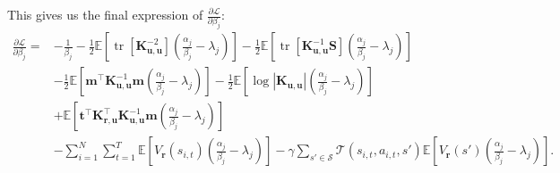 \documentclass{article}
\theoremstyle{definition}
\theoremstyle{remark}
\DeclareMathOperator{\tr}{tr}
\newcommand{\Kuu}{\mathbf{K}_{\mathbf{u},\mathbf{u}}}
\newcommand{\Kru}{\mathbf{K}_{\mathbf{r},\mathbf{u}}}
\begin{document}
This gives us the final expression of $\frac{\partial\mathcal{L}}{\partial\beta_j}$:
\[
  \begin{split}
    \frac{\partial\mathcal{L}}{\partial\beta_j} = &- \frac{1}{\beta_j} -
    \frac{1}{2}\mathbb{E} \left[ \tr[\Kuu^{-2}] \left( \frac{\alpha_j}{\beta_j}
        - \lambda_j \right) \right] - \frac{1}{2}\mathbb{E} \left[
      \tr[\Kuu^{-1}\mathbf{S}] \left(\frac{\alpha_j}{\beta_j} - \lambda_j
      \right) \right] \\
    &- \frac{1}{2}\mathbb{E} \left[ \mathbf{m}^\intercal\Kuu^{-1}\mathbf{m}
      \left(\frac{\alpha_j}{\beta_j} - \lambda_j \right) \right] -
    \frac{1}{2}\mathbb{E} \left[ \log|\Kuu| \left(\frac{\alpha_j}{\beta_j} -
        \lambda_j \right) \right] \\
    &+ \mathbb{E} \left[ \mathbf{t}^\intercal\Kru^\intercal\Kuu^{-1}\mathbf{m}
      \left(\frac{\alpha_j}{\beta_j} - \lambda_j \right) \right] \\
    &- \sum_{i=1}^N \sum_{t=1}^T \mathbb{E} \left[ V_{\mathbf{r}}(s_{i,t})
      \left(\frac{\alpha_j}{\beta_j} - \lambda_j \right) \right] -
    \gamma\sum_{s' \in \mathcal{S}} \mathcal{T}(s_{i,t}, a_{i,t}, s')\mathbb{E}
    \left[V_{\mathbf{r}}(s') \left(\frac{\alpha_j}{\beta_j} - \lambda_j \right) \right].
  \end{split}
\]



\end{document}

